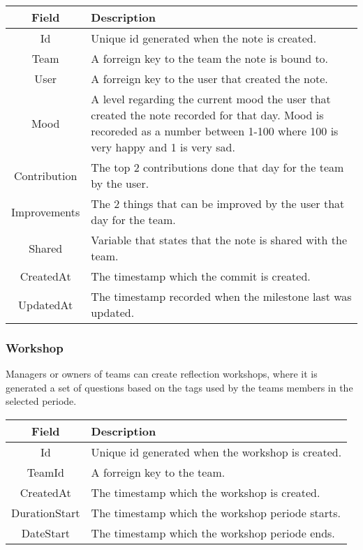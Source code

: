 \vspace{0.5cm}
\begin{tabularx}{\linewidth}{| c | X |}
    \hline
    \rowcolor[gray]{0.8}
    \textbf{Field} & \textbf{Description} \\
    \hline
    Id & Unique id generated when the note is created.\\ \hline
    Team & A forreign key to the team the note is bound to.\\ \hline
   	User & A forreign key to the user that created the note.\\ \hline
   	Mood & A level regarding the current mood the user that created the note recorded for that day. Mood is recoreded as a number between 1-100 where 100 is very happy and 1 is very sad.\\ \hline
   	Contribution & The top 2 contributions done that day for the team by the user.\\ \hline
   	Improvements & The 2 things that can be improved by the user that day for the team.\\ \hline
   	Shared & Variable that states that the note is shared with the team.\\ \hline
    CreatedAt & The timestamp which the commit is created.\\ \hline
    UpdatedAt & The timestamp recorded when the milestone last was updated.\\ 
    \hline
\end{tabularx}
\vspace{0.5cm}

\subsubsection*{Workshop}
Managers or owners of teams can create reflection workshops, where it is generated a set of questions based on the tags used by the teams members in the selected periode. \\

\vspace{0.5cm}
\begin{tabularx}{\linewidth}{| c | X |}
    \hline
    \rowcolor[gray]{0.8}
    \textbf{Field} & \textbf{Description} \\
    \hline
    Id & Unique id generated when the workshop is created.\\ \hline
   	TeamId & A forreign key to the team.\\ \hline
   	CreatedAt & The timestamp which the workshop is created.\\ \hline
   	DurationStart & The timestamp which the workshop periode starts.\\ \hline
   	DateStart & The timestamp which the workshop periode ends.\\ 
    \hline
\end{tabularx}
\vspace{0.5cm}

